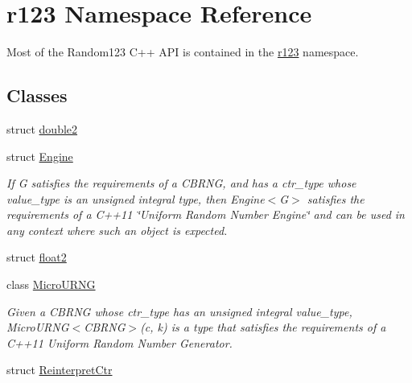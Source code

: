\hypertarget{namespacer123}{}\section{r123 Namespace Reference}
\label{namespacer123}


Most of the Random123 C++ A\+PI is contained in the \hyperlink{namespacer123}{r123} namespace.  


\subsection*{Classes}
\begin{DoxyCompactItemize}
\item 
struct \hyperlink{structr123_1_1double2}{double2}
\item 
struct \hyperlink{structr123_1_1Engine}{Engine}
\begin{DoxyCompactList}\small\item\em If G satisfies the requirements of a C\+B\+R\+NG, and has a ctr\+\_\+type whose value\+\_\+type is an unsigned integral type, then Engine$<$\+G$>$ satisfies the requirements of a C++11 \char`\"{}\+Uniform Random Number Engine\char`\"{} and can be used in any context where such an object is expected. \end{DoxyCompactList}\item 
struct \hyperlink{structr123_1_1float2}{float2}
\item 
class \hyperlink{classr123_1_1MicroURNG}{Micro\+U\+R\+NG}
\begin{DoxyCompactList}\small\item\em Given a C\+B\+R\+NG whose ctr\+\_\+type has an unsigned integral value\+\_\+type, Micro\+U\+R\+N\+G$<$\+C\+B\+R\+N\+G$>$(c, k) is a type that satisfies the requirements of a C++11 Uniform Random Number Generator. \end{DoxyCompactList}\item 
struct \hyperlink{structr123_1_1ReinterpretCtr}{Reinterpret\+Ctr}
\end{DoxyCompactItemize}
